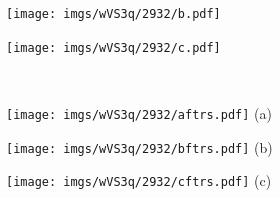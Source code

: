 \begin{figure}
\begin{minipage}{0.48\linewidth}
          \begin{minipage}{\wii}
            \centering
            \texttt{[image: imgs/wVS3q/2932/b.pdf]}
          \end{minipage}  
          \begin{minipage}{\wii}
            \centering
            \texttt{[image: imgs/wVS3q/2932/c.pdf]}
          \end{minipage} 
          \\
          \begin{minipage}{\wii}
            \centering
            \texttt{[image: imgs/wVS3q/2932/aftrs.pdf]}
            \newline
            (a)
          \end{minipage}  
          \begin{minipage}{\wii}
            \centering
            \texttt{[image: imgs/wVS3q/2932/bftrs.pdf]}
            \newline
            (b)
          \end{minipage}  
          \begin{minipage}{\wii}
            \centering
            \texttt{[image: imgs/wVS3q/2932/cftrs.pdf]}
            \newline
            (c)
          \end{minipage} 
    \end{minipage}%
    \vspace*{-2mm}
    \caption{\myCap}
    \label{fig:3qVSw}
        \vspace*{2mm}
    \end{figure}
